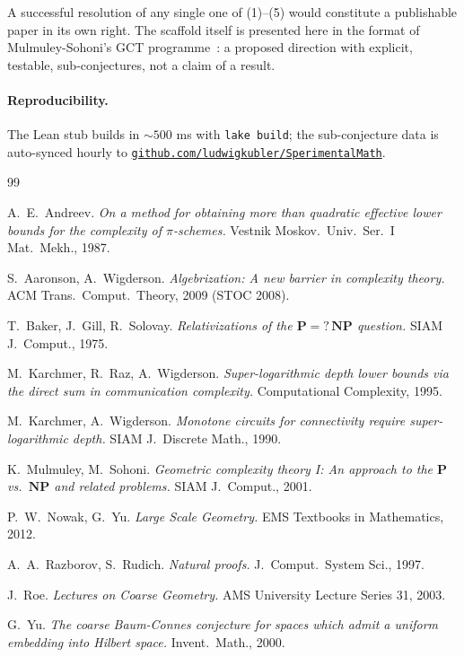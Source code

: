 \documentclass[11pt,a4paper]{article}
\begin{document}
A successful resolution of any single one of (1)--(5) would constitute
a publishable paper in its own right. The scaffold itself is presented
here in the format of Mulmuley-Sohoni's GCT programme~\cite{MulmuleySohoni2001}: a
proposed direction with explicit, testable, sub-conjectures, not a claim
of a result.

\paragraph{Reproducibility.}
The Lean stub builds in $\sim\!500$ ms with \texttt{lake build}; the
sub-conjecture data is auto-synced hourly to
\href{https://github.com/ludwigkubler/SperimentalMath}{\texttt{github.com/ludwigkubler/SperimentalMath}}.

\begin{thebibliography}{99}

A.~E.~Andreev.
\emph{On a method for obtaining more than quadratic effective
lower bounds for the complexity of $\pi$-schemes.}
Vestnik Moskov.\ Univ.\ Ser.\ I Mat.\ Mekh., 1987.

S.~Aaronson, A.~Wigderson.
\emph{Algebrization: A new barrier in complexity theory.}
ACM Trans.\ Comput.\ Theory, 2009 (STOC 2008).

T.~Baker, J.~Gill, R.~Solovay.
\emph{Relativizations of the $\mathbf{P} = ?\, \mathbf{NP}$ question.}
SIAM J.\ Comput., 1975.

M.~Karchmer, R.~Raz, A.~Wigderson.
\emph{Super-logarithmic depth lower bounds via the direct sum in
communication complexity.}
Computational Complexity, 1995.

M.~Karchmer, A.~Wigderson.
\emph{Monotone circuits for connectivity require super-logarithmic
depth.}
SIAM J.\ Discrete Math., 1990.

K.~Mulmuley, M.~Sohoni.
\emph{Geometric complexity theory I: An approach to the
$\mathbf{P}$ vs.\ $\mathbf{NP}$ and related problems.}
SIAM J.\ Comput., 2001.

P.~W.~Nowak, G.~Yu.
\emph{Large Scale Geometry.}
EMS Textbooks in Mathematics, 2012.

A.~A.~Razborov, S.~Rudich.
\emph{Natural proofs.}
J.\ Comput.\ System Sci., 1997.

J.~Roe.
\emph{Lectures on Coarse Geometry.}
AMS University Lecture Series 31, 2003.

G.~Yu.
\emph{The coarse Baum-Connes conjecture for spaces which admit a uniform
embedding into Hilbert space.}
Invent.\ Math., 2000.

\end{thebibliography}
\end{document}
